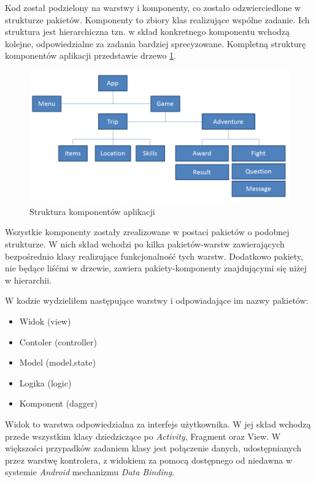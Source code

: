 \documentclass[openright]{xmgr}
\begin{document}
Kod został podzielony na warstwy i komponenty, co zostało odzwierciedlone w strukturze pakietów. 
Komponenty to zbiory klas realizujące wspólne zadanie. Ich struktura jest hierarchiczna tzn. w skład konkretnego komponentu wchodzą kolejne, odpowiedzialne za zadania bardziej sprecyzowane. Kompletną strukturę komponentów aplikacji przedstawie drzewo \ref{modules:tree}.

\begin{figure}[!tbh]
	\centering
	\includegraphics[width=1.0\hsize]{fig/modules_tree}
	\caption{Struktura komponentów aplikacji}
	\label{modules:tree}
\end{figure}

Wszystkie komponenty zostały zrealizowane w postaci pakietów o podobnej strukturze. W nich skład wchodzi po kilka pakietów-warstw zawierających bezpośrednio klasy realizujące funkcjonalność tych warstw. Dodatkowo pakiety, nie będące liśćmi w drzewie, zawiera pakiety-komponenty znajdującymi się niżej w hierarchii.

W kodzie wydzieliłem następujące warstwy i odpowiadające im nazwy pakietów:
\begin{itemize}
	\item Widok (view)
	\item Contoler (controller)
	\item Model (model,state)
	\item Logika (logic)
	\item Komponent (dagger)
\end{itemize}

Widok to warstwa odpowiedzialna za interfejs użytkownika. W jej skład wchodzą przede wszystkim klasy dziedziczące po \textit{Activity}, Fragment oraz View. W większości przypadków zadaniem klasy jest połączenie danych, udostępnianych przez warstwę kontrolera, z widokiem za pomocą dostępnego od niedawna w systemie \textit{Android} mechanizmu \textit{Data Binding}\cite{AndroidSDK:2017:Doc}.
\end{document}
